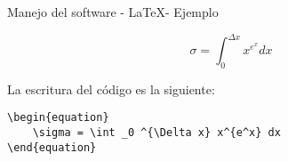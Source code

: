 \begin{frame}[fragile]{Manejo del software - \LaTeX - Ejemplo}\vspace{0pt}

\begin{equation}
	\sigma = \int _0 ^{\Delta x} x^{e^x} dx
\end{equation}

La escritura del c\'odigo es la siguiente:

\begin{center}
\begin{lstlisting}
\begin{equation}
	\sigma = \int _0 ^{\Delta x} x^{e^x} dx
\end{equation}
\end{lstlisting}
\end{center}

\end{frame}